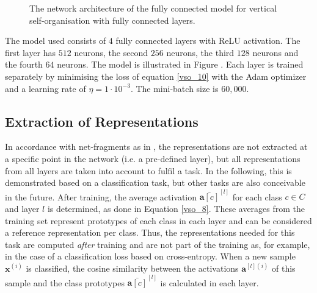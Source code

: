 \begin{figure}[h]
{
}
    \caption[Architecture of the fully connected model with vertical self-organisation]{The network architecture of the fully connected model for vertical self-organisation with fully connected layers.}
\end{figure}

The model used consists of $4$ fully connected layers with ReLU activation. The first layer has $512$ neurons, the second $256$ neurons, the third $128$ neurons and the fourth $64$ neurons. The model is illustrated in Figure . Each layer is trained separately by minimising the loss of equation \eqref{vso_10} with the Adam optimizer and a learning rate of $\eta = 1 \cdot 10^{-3}$. The mini-batch size is $60,000$. 

\subsection{Extraction of Representations}
In accordance with net-fragments as in , the representations are not extracted at a specific point in the network (i.e. a pre-defined layer), but all representations from all layers are taken into account to fulfil a task.
In the following, this is demonstrated based on a classification task, but other tasks are also conceivable in the future.
After training, the average activation $\bar{\boldsymbol{a}[c]}^{[l]}
$ for each class $c \in C$ and layer $l$ is determined, as done in Equation \eqref{vso_8}.
These averages from the training set represent prototypes of each class in each layer and can be considered a reference representation per class. Thus, the representations needed for this task are computed \emph{after} training and are not part of the training as, for example, in the case of a classification loss based on cross-entropy.
When a new sample $\boldsymbol{x}^{(i)}$ is classified, the cosine similarity between the activations $\boldsymbol{a}^{[l](i)}$ of this sample and the class prototypes $\bar{\boldsymbol{a}[c]}^{[l]}$ is calculated in each layer.

